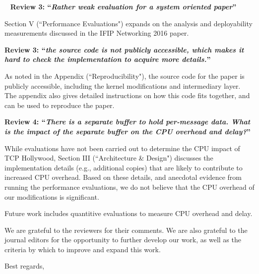 \documentclass{letter}
\begin{document}
\begin{letter}{~}
\textbf{Review 3: ``\emph{Rather weak evaluation for a system oriented paper}''}

Section V (``Performance Evaluations") expands on the analysis and deployability measurements
discussed in the IFIP Networking 2016 paper.

\textbf{Review 3: ``\emph{the source code is not publicly accessible, which makes it hard
to check the implementation to acquire more details.}''}

As noted in the Appendix (``Reproducibility"), the source code for the paper is publicly
accessible, including the kernel modifications and intermediary layer. The appendix also
gives detailed instructions on how this code fits together, and can be used to reproduce
the paper.

\textbf{Review 4: ``\emph{There is a separate buffer to hold per-message data. What is the impact of
the separate buffer on the CPU overhead and delay?}''}

While evaluations have not been carried out to determine the CPU impact of
TCP Hollywood, Section III (``Architecture \& Design") discusses the implementation
details (e.g., additional copies) that are likely to contribute to increased CPU overhead.
Based on these details, and anecdotal evidence from running the performance evaluations,
we do not believe that the CPU overhead of our modifications is significant.

Future work includes quantitive evaluations to measure CPU overhead and delay.

We are grateful to the reviewers for their comments. We are also grateful to the journal editors for the opportunity to further develop our work, as well as the criteria by which to improve and expand this work.

\closing{Best regards,}

\end{letter}
\end{document}
